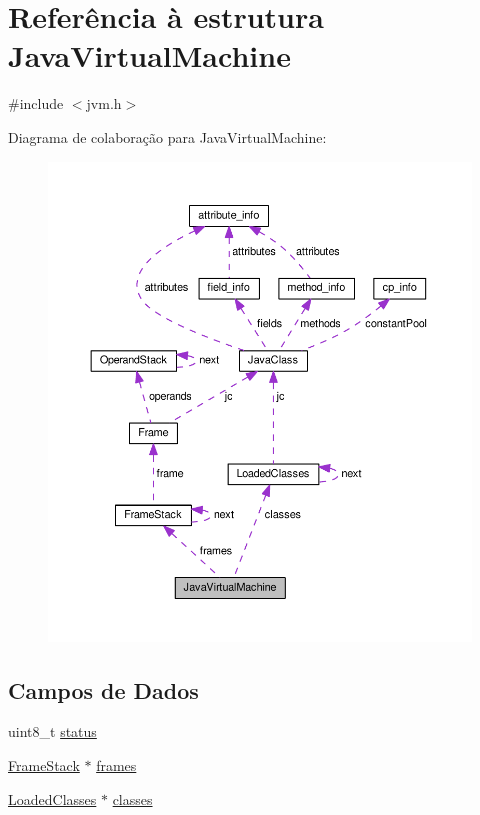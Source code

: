 \hypertarget{structJavaVirtualMachine}{}\section{Referência à estrutura Java\+Virtual\+Machine}
\label{structJavaVirtualMachine}


{\ttfamily \#include $<$jvm.\+h$>$}



Diagrama de colaboração para Java\+Virtual\+Machine\+:\nopagebreak
\begin{figure}[H]
\begin{center}
\leavevmode
\includegraphics[width=350pt]{structJavaVirtualMachine__coll__graph}
\end{center}
\end{figure}
\subsection*{Campos de Dados}
\begin{DoxyCompactItemize}
\item 
uint8\+\_\+t \hyperlink{structJavaVirtualMachine_ae8571f20c0db273c88a5ce2d52d51a04}{status}
\item 
\hyperlink{structFrameStack}{Frame\+Stack} $\ast$ \hyperlink{structJavaVirtualMachine_a6a0d723bb649fabc57742221b01b3617}{frames}
\item 
\hyperlink{structLoadedClasses}{Loaded\+Classes} $\ast$ \hyperlink{structJavaVirtualMachine_a36266aec8ba9d25b4d9f67509967dd4c}{classes}
\end{DoxyCompactItemize}


